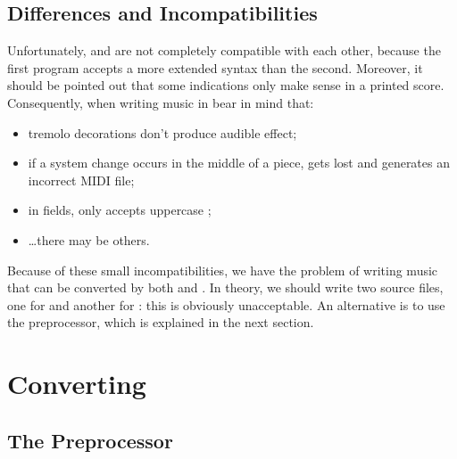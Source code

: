 \documentclass[a4paper,12pt]{book}
\begin{document}



\section{Differences and Incompatibilities}

Unfortunately, \abcm{} and \abcmid{} are not completely compatible
with each other, because the first program accepts a more extended
syntax than the second. Moreover, it should be pointed out that some
indications only make sense in a printed score. Consequently, when
writing music in \ABC{} bear in mind that:

\begin{itemize}
  
  \item tremolo decorations don't produce audible effect;
  
  \item if a system change occurs in the middle of a piece, \abcmid{}
  gets lost and generates an incorrect MIDI file;
  
  \item in  fields, \abcmid{} only accepts uppercase
  ;
  
  \item {\ldots}there may be others. %
  
\end{itemize}

Because of these small incompatibilities, we have the problem of writing
music that can be converted by both \abcm{} and \abcmid. In theory, we
should write two source files, one for \abcm{} and another for \abcmid{}:
this is obviously unacceptable. An alternative is to use the \abcpp{}
preprocessor, which is explained in the next section.


\noteseparator


\chapter{Converting}

\section{The \abcpp{} Preprocessor}
\label{sec:abcpp}
\end{document}
